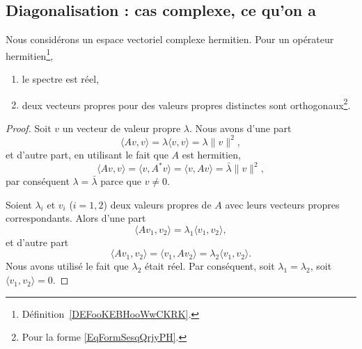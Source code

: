 \subsection{Diagonalisation : cas complexe, ce qu'on a}

\begin{lemma}      \label{LEMooVCEOooIXnTpp}
    Nous considérons un espace vectoriel complexe hermitien. Pour un opérateur hermitien\footnote{Définition~\ref{DEFooKEBHooWwCKRK}.},
    \begin{enumerate}
        \item
            le spectre est réel,
        \item
            deux vecteurs propres pour des valeurs propres distinctes sont orthogonaux\footnote{Pour la forme \eqref{EqFormSesqQrjyPH}.}.
    \end{enumerate}
\end{lemma}

\begin{proof}
    Soit \( v\) un vecteur de valeur propre \( \lambda\). Nous avons d'une part
    \begin{equation}
        \langle Av, v\rangle =\lambda\langle v, v\rangle =\lambda\| v \|^2,
    \end{equation}
    et d'autre part, en utilisant le fait que \( A\) est hermitien,
    \begin{equation}
        \langle Av, v\rangle =\langle v, A^*v\rangle =\langle v, Av\rangle =\bar\lambda\| v \|^2,
    \end{equation}
    par conséquent \( \lambda=\bar\lambda\) parce que \( v\neq 0\).

    Soient \( \lambda_i\) et \( v_i\) (\( i=1,2\)) deux valeurs propres de \( A\) avec leurs vecteurs propres correspondants. Alors d'une part
    \begin{equation}
        \langle Av_1, v_2\rangle =\lambda_1\langle v_1, v_2\rangle ,
    \end{equation}
    et d'autre part
    \begin{equation}
        \langle Av_1, v_2\rangle =\langle v_1, Av_2\rangle =\lambda_2\langle v_1, v_2\rangle .
    \end{equation}
    Nous avons utilisé le fait que \( \lambda_2\) était réel. Par conséquent, soit \( \lambda_1=\lambda_2\), soit \( \langle v_1, v_2\rangle =0\).
\end{proof}

